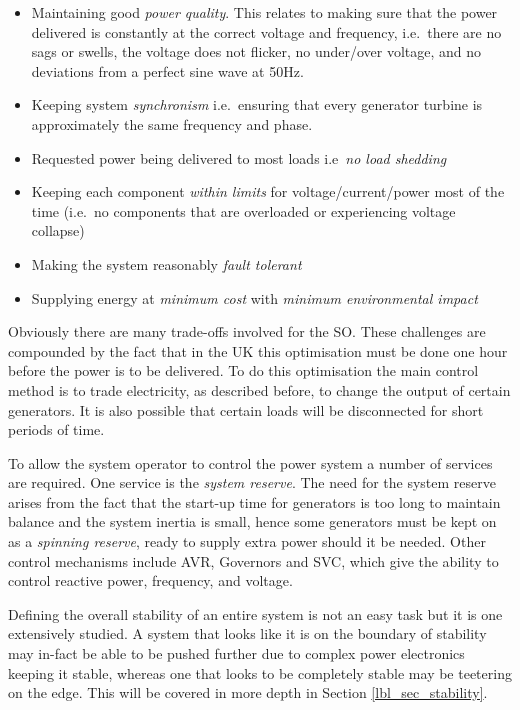 \documentclass[a4paper,oneside,12pt]{report}
\begin{document}
\begin{itemize}
\item Maintaining good \emph{power quality}. This relates to making sure that the power delivered is constantly at the correct voltage and frequency, i.e.\ there are no sags or swells, the voltage does not flicker, no under/over voltage, and no deviations from a perfect sine wave at 50Hz.

\item Keeping system \emph{synchronism} i.e.\ ensuring that every generator turbine is approximately the same frequency and phase.

\item Requested power being delivered to most loads i.e\ \emph{no load shedding}

\item Keeping each component \emph{within limits} for voltage/current/power most of the time (i.e.\ no components that are overloaded or experiencing voltage collapse)

\item Making the system reasonably \emph{fault tolerant}

\item Supplying energy at \emph{minimum cost} with \emph{minimum environmental impact}

\end{itemize}

Obviously there are many trade-offs involved for the SO. These challenges are compounded by the fact that in the UK this optimisation must be done one hour before the power is to be delivered. To do this optimisation the main control method is to trade electricity, as described before, to change the output of certain generators. It is also possible that certain loads will be disconnected for short periods of time.

To allow the system operator to control the power system a number of services are required. One service is the \emph{system reserve}. The need for the system reserve arises from the fact that the start-up time for generators is too long to maintain balance and the system inertia is small, hence some generators must be kept on as a \emph{spinning reserve}, ready to supply extra power should it be needed. Other control mechanisms include AVR, Governors and SVC, which give the ability to control reactive power, frequency, and voltage.

Defining the overall stability of an entire system is not an easy task but it is one extensively studied. A system that looks like it is on the boundary of stability may in-fact be able to be pushed further due to complex power electronics keeping it stable, whereas one that looks to be completely stable may be teetering on the edge. This will be covered in more depth in Section \ref{lbl_sec_stability}.
\end{document}
